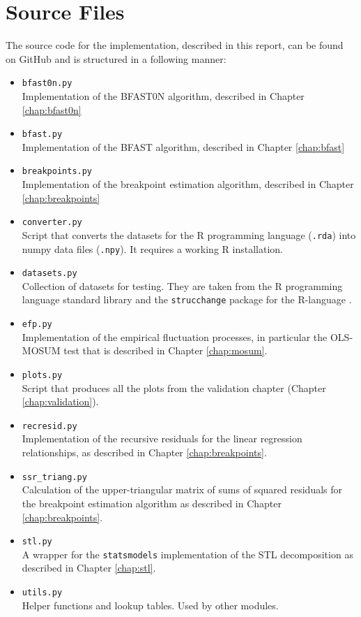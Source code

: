 \documentclass[main.tex]{subfiles}
\begin{document}
\section*{Source Files}
\label{sec:source_files}
The source code for the implementation, described in this report, can be found
on GitHub \cite{my-github} and is structured in a following manner:
\begin{itemize}
\item \texttt{bfast0n.py}\\
  Implementation of the BFAST0N algorithm, described in Chapter \ref{chap:bfast0n}
\item \texttt{bfast.py}\\
  Implementation of the BFAST algorithm, described in Chapter \ref{chap:bfast}
\item \texttt{breakpoints.py}\\
  Implementation of the breakpoint estimation algorithm, described in Chapter \ref{chap:breakpoints}
\item \texttt{converter.py}\\
  Script that converts the datasets for the R programming language (\texttt{.rda}) into numpy
  data files (\texttt{.npy}). It requires a working R installation.
\item \texttt{datasets.py}\\
  Collection of datasets for testing. They are taken from the R programming language standard library
  \cite{r-datasets} and
  the \texttt{strucchange} package for the R-language \cite{strucchange_code}.
\item \texttt{efp.py}\\
  Implementation of the empirical fluctuation processes, in particular the OLS-MOSUM test that is
  described in Chapter \ref{chap:mosum}.
\item \texttt{plots.py}\\
  Script that produces all the plots from the validation chapter (Chapter \ref{chap:validation}).
\item \texttt{recresid.py}\\
  Implementation of the recursive residuals for the linear regression relationships,
  as described in Chapter \ref{chap:breakpoints}.
\item \texttt{ssr\_triang.py}\\
  Calculation of the upper-triangular matrix of sums of squared residuals for
  the breakpoint estimation algorithm as described in Chapter \ref{chap:breakpoints}.
\item \texttt{stl.py} \\
  A wrapper for the \texttt{statsmodels} \cite{statsmodels} implementation of the STL decomposition as
  described in Chapter \ref{chap:stl}.
\item \texttt{utils.py} \\
  Helper functions and lookup tables. Used by other modules. 
\end{itemize}

\biblio
\end{document}
